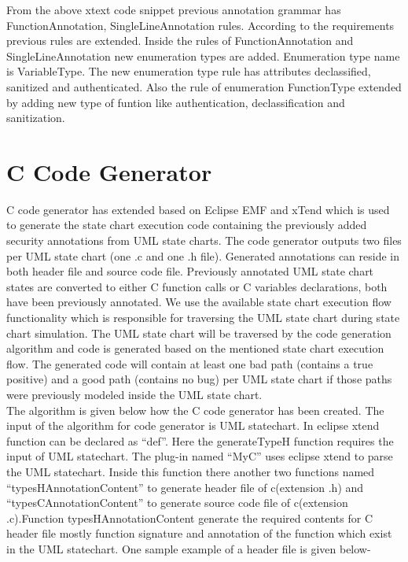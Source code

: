 From the above xtext code snippet previous annotation grammar has FunctionAnnotation, SingleLineAnnotation rules. According to the requirements previous rules are extended. Inside the rules of FunctionAnnotation and SingleLineAnnotation new enumeration types are added. Enumeration type name is VariableType. The new enumeration type rule has attributes declassified, sanitized and authenticated. Also the rule of enumeration FunctionType extended by adding new type of funtion like authentication, declassification and sanitization.

\section{C Code Generator}
C code generator has extended based on Eclipse EMF and xTend which is used to generate the state chart execution code containing the previously added security annotations from UML state charts. The code generator outputs two files per UML state chart (one .c and one
.h file). Generated annotations can reside in both header file
and source code file. Previously annotated UML state chart
states are converted to either C function calls or C variables
declarations, both have been previously annotated. We use
the available state chart execution flow functionality which is
responsible for traversing the UML state chart during state
chart simulation. The UML state chart will be traversed by the code generation algorithm and code is generated based on
the mentioned state chart execution flow. The generated code
will contain at least one bad path (contains a true positive) and
a good path (contains no bug) per UML state chart if those
paths were previously modeled inside the UML state chart.\\

The algorithm is given below how the C code generator has been created. The input of the algorithm for code generator is UML statechart. In eclipse xtend \cite{ref_20_xtend} function can be declared as \enquote{def}. Here the generateTypeH function requires the input of UML statechart. The plug-in named \enquote{MyC} uses eclipse xtend to parse the UML statechart. Inside this function there another two functions named \enquote{typesHAnnotationContent} to generate header file of c(extension .h) and \enquote{typesCAnnotationContent} to generate source code file of c(extension .c).Function typesHAnnotationContent generate the required contents for C header file mostly function signature and annotation of the function which exist in the UML statechart. One sample example of a header file is given below-

